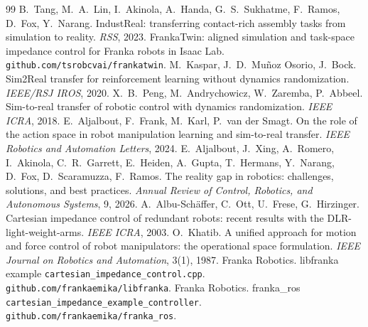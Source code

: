 {\raggedright  %
\begin{thebibliography}{99}
 B.~Tang, M.~A.~Lin, I.~Akinola, A.~Handa, G.~S.~Sukhatme, F.~Ramos, D.~Fox,
  Y.~Narang. IndustReal: transferring contact-rich assembly tasks from simulation to reality. \emph{RSS}, 2023.
 FrankaTwin: aligned simulation and task-space impedance control for Franka robots in Isaac
  Lab. \texttt{github.com/tsrobcvai/frankatwin}.
 M.~Kaspar, J.~D.~Muñoz Osorio, J.~Bock. Sim2Real transfer for reinforcement learning
  without dynamics randomization. \emph{IEEE/RSJ IROS}, 2020.
 X.~B.~Peng, M.~Andrychowicz, W.~Zaremba, P.~Abbeel. Sim-to-real transfer of robotic control
  with dynamics randomization. \emph{IEEE ICRA}, 2018.
 E.~Aljalbout, F.~Frank, M.~Karl, P.~van der Smagt. On the role of the action space
  in robot manipulation learning and sim-to-real transfer. \emph{IEEE Robotics and Automation Letters}, 2024.
 E.~Aljalbout, J.~Xing, A.~Romero, I.~Akinola, C.~R.~Garrett, E.~Heiden,
  A.~Gupta, T.~Hermans, Y.~Narang, D.~Fox, D.~Scaramuzza, F.~Ramos. The reality gap in robotics: challenges,
  solutions, and best practices. \emph{Annual Review of Control, Robotics, and Autonomous Systems}, 9, 2026.
 A.~Albu-Schäffer, C.~Ott, U.~Frese, G.~Hirzinger. Cartesian impedance control of
  redundant robots: recent results with the DLR-light-weight-arms. \emph{IEEE ICRA}, 2003.
 O.~Khatib. A unified approach for motion and force control of robot manipulators: the
  operational space formulation. \emph{IEEE Journal on Robotics and Automation}, 3(1), 1987.
 Franka Robotics. libfranka example \texttt{cartesian\_impedance\_control.cpp}.
  \texttt{github.com/frankaemika/libfranka}.
 Franka Robotics. franka\_ros \texttt{cartesian\_impedance\_example\_controller}.
  \texttt{github.com/frankaemika/franka\_ros}.
\end{thebibliography}
}
